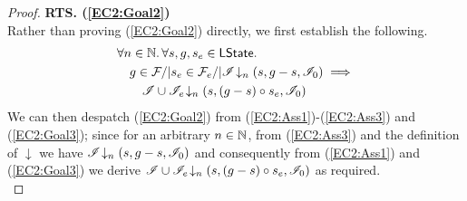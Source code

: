\begin{lemma}
\begin{proof}



\noindent\textbf{RTS. (\ref{EC2:Goal2})} \\
Rather than proving (\ref{EC2:Goal2}) directly, we first establish the following.
%
\begin{align}
	& \forall n \in \mathbb{N}.\, \forall s, g, s_e \in \textsf{LState}.\, \nonumber\\
	& \quad g \in \mathcal{F}_{} /|  s_e \in \mathcal{F}_{e} /| \mathscr{I} \!\downarrow_{n} \left(s, g-s, \mathscr{I}_0\right) \implies \nonumber\\
	& \qquad \mathscr{I} \cup \mathscr{I}_e \!\downarrow_{n} \left(s, (g-s) \circ s_e, \mathscr{I}_0\right) \label{EC2:Goal3}
\end{align}
%
We can then despatch (\ref{EC2:Goal2}) from (\ref{EC2:Ass1})-(\ref{EC2:Ass3}) and (\ref{EC2:Goal3}); since for an arbitrary $n \in \mathbb{N}$, from (\ref{EC2:Ass3}) and the definition of $\downarrow$ we have $\mathscr{I} \!\downarrow_{n} \left(s, g-s, \mathscr{I}_0\right)$ and consequently from (\ref{EC2:Ass1}) and (\ref{EC2:Goal3}) we derive $\mathscr{I} \cup \mathscr{I}_e \!\downarrow_{n} \left(s, (g-s) \circ s_e, \mathscr{I}_0\right) $ as required. \\


\end{proof}
\end{lemma}
